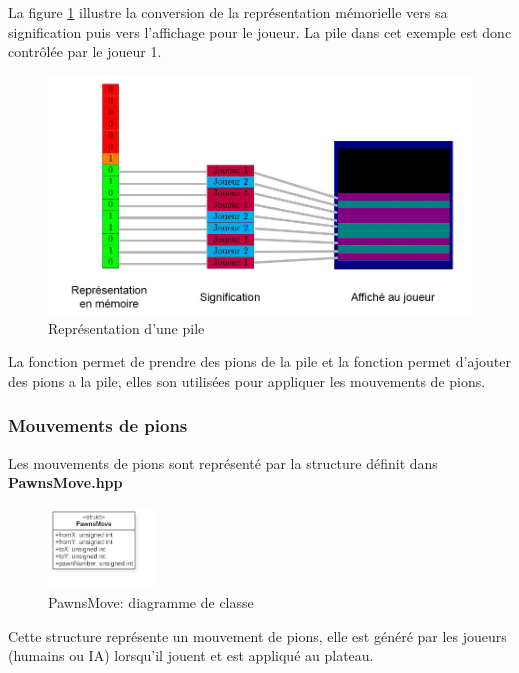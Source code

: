\documentclass[article, backcover, french, nodocumentinfo]{upmethodology-document}
\begin{document}
					La figure \ref{fig:pile_représentation} illustre la conversion de la représentation mémorielle vers sa signification puis vers l'affichage pour le joueur. La pile dans cet exemple est donc contrôlée par le joueur 1.
					\begin{figure}[H]
						\centering
						\includegraphics[width=\textwidth]{figures/pile}
						\caption{Représentation d'une pile}
						\label{fig:pile_représentation}
					\end{figure}
					La fonction  permet de prendre des pions de la pile et la fonction  permet d'ajouter des pions a la pile, elles son utilisées pour appliquer les mouvements de pions.
			\subsubsection{Mouvements de pions}
					Les mouvements de pions sont représenté par la structure  définit dans \textbf{PawnsMove.hpp}
					\begin{figure}[H]
						\centering
						\includegraphics[width=0.25\textwidth]{figures/PawnsMoveDiagram}
						\caption{PawnsMove: diagramme de classe}
						\label{fig:PawnsMoveDiagram}
					\end{figure}
					Cette structure représente un mouvement de pions, elle est généré par les joueurs (humains ou IA) lorsqu'il jouent et est appliqué au plateau.
\end{document}
